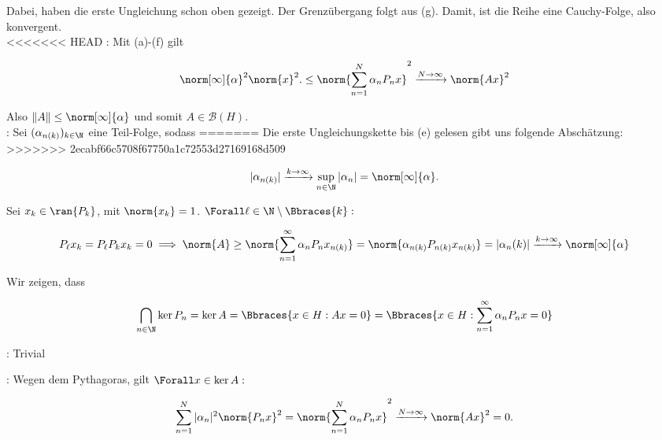 \begin{solution}
Dabei, haben die erste Ungleichung schon oben gezeigt.
Der Grenzübergang folgt aus (g).
Damit, ist die Reihe eine Cauchy-Folge, also konvergent. \\

<<<<<<< HEAD
:
Mit (a)-(f) gilt

\begin{align*}
    \norm[\infty]{\alpha}^2 \norm{x}^2.
    \leq
    \norm{\sum_{n = 1}^N \alpha_n P_n x}^2
    \xrightarrow{N \to \infty}
    \norm{A x}^2
\end{align*}

Also $\|A\| \leq \norm[\infty]{\alpha}$ und somit $A \in \mathcal{B}(H)$. \\

:
Sei $(\alpha_{n(k)})_{k \in \N}$ eine Teil-Folge, sodass
=======
Die erste Ungleichungskette bis (e) gelesen gibt uns folgende Abschätzung:
>>>>>>> 2ecabf66c5708f67750a1c72553d27169168d509

\begin{align*}
  |\alpha_{n(k)}|
  \xrightarrow{k \to \infty}
  \sup_{n \in \N} |\alpha_n|
  =
  \norm[\infty]{\alpha}.
\end{align*}

Sei $x_k \in \ran{P_k}$, mit $\norm{x_k} = 1$.
$\Forall \ell \in \N \setminus \Bbraces{k}:$

\begin{align*}
  P_\ell x_k = P_\ell P_k x_k = 0
  \implies
  \norm{A}
  \geq
  \norm{\sum_{n=1}^\infty \alpha_n P_n x_{n(k)}}
  =
  \norm{\alpha_{n(k)} P_{n(k)} x_{n(k)}}
  =
  |\alpha_n(k)|
  \xrightarrow{k \to \infty}
  \norm[\infty]{\alpha}
\end{align*}

Wir zeigen, dass

\begin{align*}
  \bigcap_{n \in \N} \ker{P_n}
  =
  \ker{A}
  =
  \Bbraces{x \in H: A x = 0}
  =
  \Bbraces{x \in H: \sum_{n=1}^\infty \alpha_n P_n x = 0}
\end{align*}

\Quote{$\subseteq$}:
Trivial

\Quote{$\supseteq$}:
Wegen dem Pythagoras, gilt $\Forall x \in \ker{A}:$

\begin{align*}
    \sum_{n=1}^N |\alpha_n|^2 \norm{P_n x}^2
    =
    \norm{\sum_{n = 1}^N \alpha_n P_n x}^2
    \xrightarrow{N \rightarrow \infty}
    \norm{A x}^2 = 0.
\end{align*}


\end{solution}
